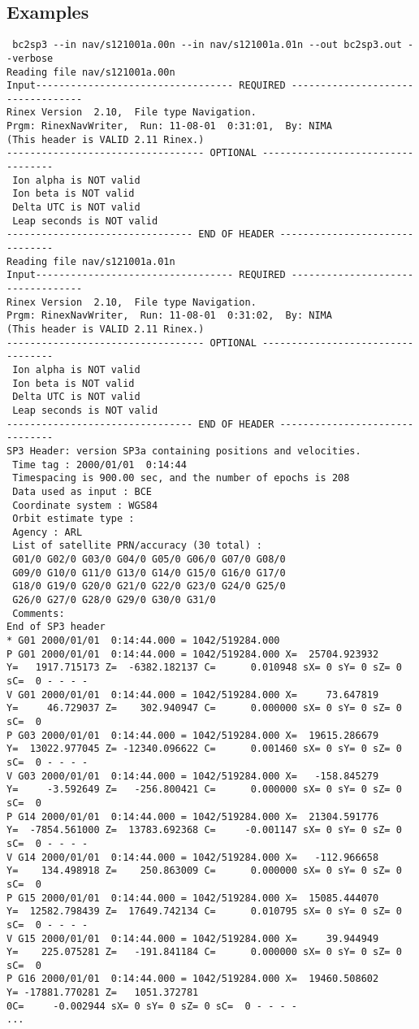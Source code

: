 \subsection{Examples}
\begin{verbatim}
 bc2sp3 --in nav/s121001a.00n --in nav/s121001a.01n --out bc2sp3.out --verbose
Reading file nav/s121001a.00n
Input---------------------------------- REQUIRED ----------------------------------
Rinex Version  2.10,  File type Navigation.
Prgm: RinexNavWriter,  Run: 11-08-01  0:31:01,  By: NIMA
(This header is VALID 2.11 Rinex.)
---------------------------------- OPTIONAL ----------------------------------
 Ion alpha is NOT valid
 Ion beta is NOT valid
 Delta UTC is NOT valid
 Leap seconds is NOT valid
-------------------------------- END OF HEADER -------------------------------
Reading file nav/s121001a.01n
Input---------------------------------- REQUIRED ----------------------------------
Rinex Version  2.10,  File type Navigation.
Prgm: RinexNavWriter,  Run: 11-08-01  0:31:02,  By: NIMA
(This header is VALID 2.11 Rinex.)
---------------------------------- OPTIONAL ----------------------------------
 Ion alpha is NOT valid
 Ion beta is NOT valid
 Delta UTC is NOT valid
 Leap seconds is NOT valid
-------------------------------- END OF HEADER -------------------------------
SP3 Header: version SP3a containing positions and velocities.
 Time tag : 2000/01/01  0:14:44
 Timespacing is 900.00 sec, and the number of epochs is 208
 Data used as input : BCE
 Coordinate system : WGS84
 Orbit estimate type :    
 Agency : ARL
 List of satellite PRN/accuracy (30 total) :
 G01/0 G02/0 G03/0 G04/0 G05/0 G06/0 G07/0 G08/0
 G09/0 G10/0 G11/0 G13/0 G14/0 G15/0 G16/0 G17/0
 G18/0 G19/0 G20/0 G21/0 G22/0 G23/0 G24/0 G25/0
 G26/0 G27/0 G28/0 G29/0 G30/0 G31/0
 Comments:
End of SP3 header
* G01 2000/01/01  0:14:44.000 = 1042/519284.000
P G01 2000/01/01  0:14:44.000 = 1042/519284.000 X=  25704.923932 
Y=   1917.715173 Z=  -6382.182137 C=      0.010948 sX= 0 sY= 0 sZ= 0 sC=  0 - - - -
V G01 2000/01/01  0:14:44.000 = 1042/519284.000 X=     73.647819 
Y=     46.729037 Z=    302.940947 C=      0.000000 sX= 0 sY= 0 sZ= 0 sC=  0
P G03 2000/01/01  0:14:44.000 = 1042/519284.000 X=  19615.286679 
Y=  13022.977045 Z= -12340.096622 C=      0.001460 sX= 0 sY= 0 sZ= 0 sC=  0 - - - -
V G03 2000/01/01  0:14:44.000 = 1042/519284.000 X=   -158.845279 
Y=     -3.592649 Z=   -256.800421 C=      0.000000 sX= 0 sY= 0 sZ= 0 sC=  0
P G14 2000/01/01  0:14:44.000 = 1042/519284.000 X=  21304.591776 
Y=  -7854.561000 Z=  13783.692368 C=     -0.001147 sX= 0 sY= 0 sZ= 0 sC=  0 - - - -
V G14 2000/01/01  0:14:44.000 = 1042/519284.000 X=   -112.966658 
Y=    134.498918 Z=    250.863009 C=      0.000000 sX= 0 sY= 0 sZ= 0 sC=  0
P G15 2000/01/01  0:14:44.000 = 1042/519284.000 X=  15085.444070 
Y=  12582.798439 Z=  17649.742134 C=      0.010795 sX= 0 sY= 0 sZ= 0 sC=  0 - - - -
V G15 2000/01/01  0:14:44.000 = 1042/519284.000 X=     39.944949 
Y=    225.075281 Z=   -191.841184 C=      0.000000 sX= 0 sY= 0 sZ= 0 sC=  0
P G16 2000/01/01  0:14:44.000 = 1042/519284.000 X=  19460.508602 
Y= -17881.770281 Z=   1051.372781 
0C=     -0.002944 sX= 0 sY= 0 sZ= 0 sC=  0 - - - -
...

\end{verbatim}
